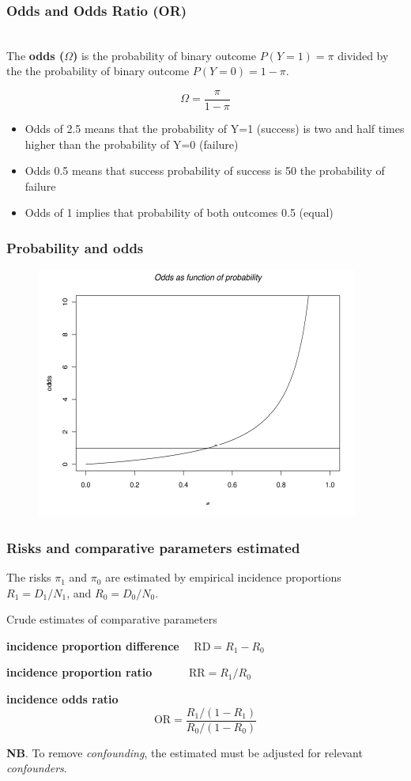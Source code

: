 \documentclass[handout,12pt]{beamer}
\begin{document}
\begin{frame}[fragile] \frametitle{Odds and Odds Ratio (OR)}
\ \\
The {\bf odds ($\Omega$)} is the probability of binary outcome $P(Y=1)=\pi$ divided by the the probability of binary outcome $P(Y=0)=1-\pi$. 

$$\Omega=\frac{\pi}{1-\pi}$$

\begin{itemize}
\item Odds of 2.5 means that the probability of Y=1 (success) is two
and half times higher than the probability of Y=0 (failure)
\item Odds 0.5 means that success probability of success is 50%
the probability of failure
\item Odds of 1 implies that probability of both
outcomes 0.5 (equal)

\end{itemize}
\end{frame}

\begin{frame}
\frametitle{Probability and odds}
\begin{figure}
\centering
\includegraphics[width=0.9\linewidth]{odds}
\end{figure}
\end{frame}

\begin{frame}[fragile] \frametitle{Risks and comparative parameters estimated}

The risks $\pi_1$ and $\pi_0$ are estimated by empirical incidence proportions $R_1=D_1/N_1$, and $R_0=D_0/N_0$.

\bigskip
Crude estimates of comparative parameters
\bi
\item {\bf incidence proportion difference} $\quad \text{RD} = R_1 - R_0$
\item {\bf incidence proportion ratio} $\quad \quad \quad \text{RR} = R_1/R_0$
\item {\bf incidence odds ratio}
$$\text{OR} = \frac{R_1/(1 - R_1)}{R_0/(1 - R_0)}$$
\ei

{\bf NB}. To remove {\it confounding}, the estimated must be adjusted for relevant {\it confounders}.
\end{frame}
\end{document}
